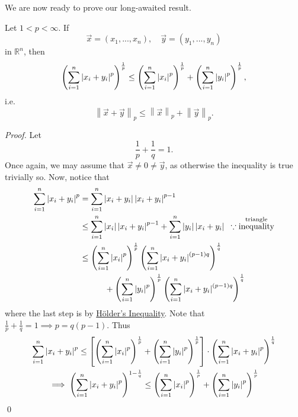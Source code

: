 \documentclass[notoc,notitlepage]{tufte-book}
\newcommand{\norm}[1]{\left\| #1 \right\|}
\begin{document}
We are now ready to prove our long-awaited result.

\begin{thm}
\label{thm:minkowshi_s_inequality}
  Let $1 < p < \infty$. If
  \begin{equation*}
    \vec{x} = ( x_1, ..., x_n ), \quad \vec{y} = ( y_1, ..., y_n )
  \end{equation*}
  in $\mathbb{R}^n$, then
  \begin{equation*}
    \left( \sum_{i=1}^{n} \left|x_i + y_i\right|^p \right)^\frac{1}{p} \leq \left( \sum_{i=1}^{n} \left|x_i\right|^p \right)^\frac{1}{p} + \left( \sum_{i=1}^{n} \left|y_i\right|^p \right)^\frac{1}{p},
  \end{equation*}
  i.e.
  \begin{equation*}
    \norm{\vec{x} + \vec{y}}_p \leq \norm{\vec{x}}_p + \norm{\vec{y}}_p.
  \end{equation*}
\end{thm}

\begin{proof}
  Let
  \begin{equation*}
    \frac{1}{p} + \frac{1}{q} = 1.
  \end{equation*}
  Once again, we may assume that $\vec{x} \neq 0 \neq \vec{y}$, as otherwise the inequality is true trivially so. Now, notice that
  \begin{align*}
    \sum_{i=1}^{n} \left|x_i + y_i\right|^p &= \sum_{i=1}^{n} \left|x_i + y_i\right| \left|x_i + y_i\right|^{p - 1} \\
                                     &\leq \sum_{i=1}^{n} \left|x_i\right| \left|x_i + y_i\right|^{p - 1} + \sum_{i=1}^{n} \left|y_i\right|\left|x_i + y_i\right| \enspace \because \overset{\text{triangle}}{\text{inequality}} \\
                                     &\leq \left( \sum_{i=1}^{n} \left|x_i\right|^p \right)^\frac{1}{p} \left( \sum_{i=1}^{n} \left|x_i + y_i\right|^{(p - 1)q} \right)^\frac{1}{q} \\
                                     & \qquad\quad + \left( \sum_{i=1}^{n} \left|y_i\right|^p \right)^\frac{1}{p} \left( \sum_{i=1}^{n} \left|x_i + y_i\right|^{(p - 1)q} \right)^\frac{1}{q}
  \end{align*}
  where the last step is by \hyperref[thm:holder_s_inequality]{H\"{o}lder's Inequality}. Note that $\frac{1}{p} + \frac{1}{q} = 1 \implies p = q(p - 1)$. Thus
  \begin{gather*}
    \sum_{i=1}^{n} \left|x_i + y_i\right|^p \leq \left[ \left( \sum_{i=1}^{n} \left|x_i\right|^p \right)^\frac{1}{p} + \left( \sum_{i=1}^{n} \left|y_i\right|^p \right)^{\frac{1}{p}} \right] \cdot \left( \sum_{i=1}^{n} \left|x_i + y_i\right|^p \right)^\frac{1}{q} \\
    \implies \left( \sum_{i=1}^{n} \left|x_i + y_i\right|^p \right)^{1 - \frac{1}{q}} \leq \left( \sum_{i=1}^{n} \left|x_i\right|^p \right)^\frac{1}{p} + \left( \sum_{i=1}^{n} \left|y_i\right|^p \right)^\frac{1}{p}
  \end{gather*}\qed
\end{proof}
\end{document}
